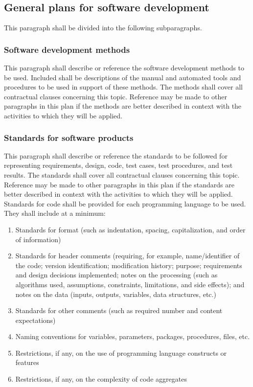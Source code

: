 \documentclass{fidata-report-template}
\begin{document}
\subsection{General plans for software development}

This paragraph shall be divided into the following subparagraphs.

\subsubsection{Software development methods}

This paragraph shall describe or reference the software development
methods to be used. Included shall be descriptions of the manual and
automated tools and procedures to be used in support of these methods.
The methods shall cover all contractual clauses concerning this topic.
Reference may be made to other paragraphs in this plan if the methods
are better described in context with the activities to which they will
be applied.

\subsubsection{Standards for software products}

This paragraph shall describe or reference the standards to be followed
for representing requirements, design, code, test cases, test
procedures, and test results. The standards shall cover all contractual
clauses concerning this topic. Reference may be made to other paragraphs
in this plan if the standards are better described in context with the
activities to which they will be applied. Standards for code shall be
provided for each programming language to be used. They shall include at
a minimum:

\begin{enumerate}
\itemsep1pt\parskip0pt
\item
  Standards for format (such as indentation, spacing, capitalization,
  and order of information)
\item
  Standards for header comments (requiring, for example, name/identifier
  of the code; version identification; modification history; purpose;
  requirements and design decisions implemented; notes on the processing
  (such as algorithms used, assumptions, constraints, limitations, and
  side effects); and notes on the data (inputs, outputs, variables, data
  structures, etc.)
\item
  Standards for other comments (such as required number and content
  expectations)
\item
  Naming conventions for variables, parameters, packages, procedures,
  files, etc.
\item
  Restrictions, if any, on the use of programming language constructs or
  features
\item
  Restrictions, if any, on the complexity of code aggregates
\end{enumerate}
\end{document}
